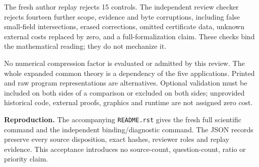 \documentclass[11pt,a4paper]{article}
\begin{document}
The fresh author replay rejects 15 controls. The independent review checker
rejects fourteen further scope, evidence and byte corruptions, including false
small-field intersections, erased corrections, omitted certificate data,
unknown external costs replaced by zero, and a full-formalization claim.
These checks bind the mathematical reading; they do not mechanize it.

No numerical compression factor is evaluated or admitted by this review.
The whole expanded common theory is a dependency of the five applications.
Printed and raw program representations are alternatives. Optional validation
must be included on both sides of a comparison or excluded on both sides;
unprovided historical code, external proofs, graphics and runtime are not
assigned zero cost.

\textbf{Reproduction.} The accompanying \texttt{README.rst} gives the fresh full
scientific command and the independent binding/diagnostic command. The JSON
records preserve every source disposition, exact hashes, reviewer roles and
replay evidence. This acceptance introduces no source-count, question-count,
ratio or priority claim.
\end{document}
